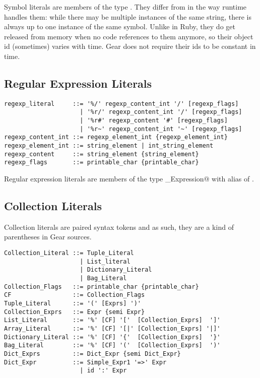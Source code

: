 Symbol literals are members of the type \lstinline@Symbol@. They differ from  in the way runtime handles them: while there may be multiple instances of the same string, there is always up to one instance of the same symbol. Unlike in Ruby, they do get released from memory when no code references to them anymore, so their object id (sometimes) varies with time. Gear does not require their ids to be constant in time. 









\subsection{Regular Expression Literals}\label{sec:regexpliterals}

\syntax\begin{lstlisting}
regexp_literal     ::= '%/' regexp_content_int '/' [regexp_flags]
	                 | '%r/' regexp_content_int '/' [regexp_flags]
	                 | '%r#' regexp_content '#' [regexp_flags]
	                 | '%r~' regexp_content_int '~' [regexp_flags]
regexp_content_int ::= regexp_element_int {regexp_element_int}
regexp_element_int ::= string_element | int_string_element
regexp_content     ::= string_element {string_element}
regexp_flags       ::= printable_char {printable_char}
\end{lstlisting}

Regular expression literals are members of the type \lstinline@Regular_Expression@ with alias of \lstinline@Regexp@. 






\subsection{Collection Literals}\label{sec:collectionliterals}

Collection literals are paired syntax tokens and as such, they are a kind of parentheses in Gear sources. 

\syntax\begin{lstlisting}
Collection_Literal ::= Tuple_Literal
	                 | List_literal
	                 | Dictionary_Literal
	                 | Bag_Literal
Collection_Flags   ::= printable_char {printable_char}
CF                 ::= Collection_Flags
Tuple_Literal      ::= '(' [Exprs] ')'
Collection_Exprs   ::= Expr {semi Expr}
List_Literal       ::= '%' [CF] '['  [Collection_Exprs]  ']'
Array_Literal      ::= '%' [CF] '[|' [Collection_Exprs] '|]'
Dictionary_Literal ::= '%' [CF] '{'  [Collection_Exprs]  '}'
Bag_Literal        ::= '%' [CF] '('  [Collection_Exprs]  ')'
Dict_Exprs         ::= Dict_Expr {semi Dict_Expr}
Dict_Expr          ::= Simple_Expr1 '=>' Expr
	                 | id ':' Expr
\end{lstlisting}

